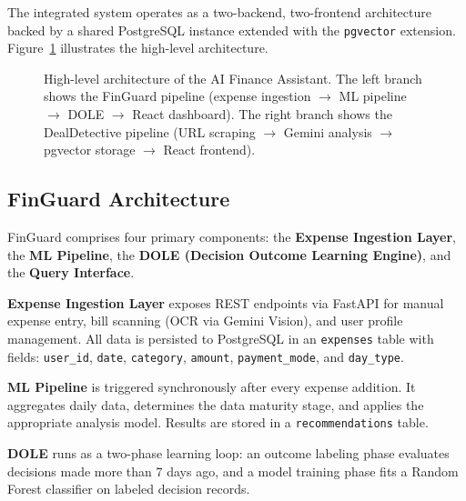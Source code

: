 \documentclass[]{IEEEtran}
\begin{document}
The integrated system operates as a two-backend, two-frontend architecture backed by a shared PostgreSQL instance extended with the \texttt{pgvector} extension. Figure~\ref{fig:arch_overview} illustrates the high-level architecture.

\begin{figure}[H]
    \centering
    \caption{High-level architecture of the AI Finance Assistant. The left branch shows the FinGuard pipeline (expense ingestion $\rightarrow$ ML pipeline $\rightarrow$ DOLE $\rightarrow$ React dashboard). The right branch shows the DealDetective pipeline (URL scraping $\rightarrow$ Gemini analysis $\rightarrow$ pgvector storage $\rightarrow$ React frontend).}
    \label{fig:arch_overview}
\end{figure}

\subsection{FinGuard Architecture}

FinGuard comprises four primary components: the \textbf{Expense Ingestion Layer}, the \textbf{ML Pipeline}, the \textbf{DOLE (Decision Outcome Learning Engine)}, and the \textbf{Query Interface}.

\textbf{Expense Ingestion Layer} exposes REST endpoints via FastAPI for manual expense entry, bill scanning (OCR via Gemini Vision), and user profile management. All data is persisted to PostgreSQL in an \texttt{expenses} table with fields: \texttt{user\_id}, \texttt{date}, \texttt{category}, \texttt{amount}, \texttt{payment\_mode}, and \texttt{day\_type}.

\textbf{ML Pipeline} is triggered synchronously after every expense addition. It aggregates daily data, determines the data maturity stage, and applies the appropriate analysis model. Results are stored in a \texttt{recommendations} table.

\textbf{DOLE} runs as a two-phase learning loop: an outcome labeling phase evaluates decisions made more than 7 days ago, and a model training phase fits a Random Forest classifier on labeled decision records.
\end{document}
